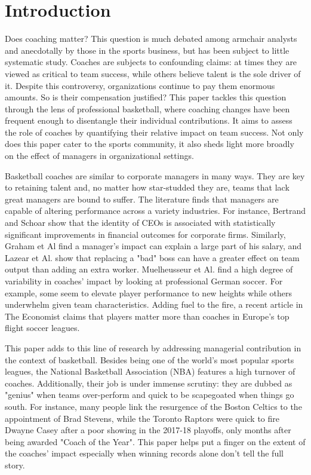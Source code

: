 \documentclass[main.tex]{subfiles}
\begin{document}
\section{Introduction}

Does coaching matter? This question is much debated among armchair analysts and anecdotally by those in the sports business, but has been subject to little systematic study. Coaches are subjects to confounding claims: at times they are viewed as critical to team success, while others believe talent is  the sole driver of it. Despite this controversy, organizations continue to pay them enormous amounts. So is their compensation justified? This paper tackles this question through the lens of professional basketball, where coaching changes have been frequent enough to disentangle their individual contributions. It aims to assess the role of coaches by quantifying their relative impact on team success. Not only does this paper cater to the sports community, it also sheds light more broadly on the effect of managers in organizational settings. 

Basketball coaches are similar to corporate managers in many ways. They are key to retaining talent and, no matter how star-studded they are, teams that lack great managers are bound to suffer. The literature finds that managers are capable of altering performance across a variety industries. For instance, Bertrand and Schoar \cite{schoar} show that the identity of CEOs is associated with statistically significant improvements in financial outcomes for corporate firms. Similarly, Graham et Al \cite{graham} find a manager's impact can explain a large part of his salary, and Lazear et Al. \cite{lazear} show that replacing a "bad" boss can have a greater effect on team output than adding an extra worker. Muelheusseur et Al. \cite{muehlheusser} find a high degree of variability in coaches' impact by looking at professional German soccer. For example, some seem to elevate player performance to new heights while others underwhelm given team characteristics. Adding fuel to the fire, a recent article in The Economist \cite{economist} claims that players matter more than coaches in Europe's top flight soccer leagues.

This paper adds to this line of research by addressing managerial contribution in the context of basketball. Besides being one of the world's most popular sports leagues, the National Basketball Association (NBA) features a high turnover of coaches. Additionally, their job is under immense scrutiny: they are dubbed as "genius" when teams over-perform and quick to be scapegoated when things go south. For instance, many people link the resurgence of the Boston Celtics to the appointment of Brad Stevens, while the Toronto Raptors were quick to fire Dwayne Casey after a poor showing in the 2017-18 playoffs, only months after being awarded "Coach of the Year". This paper helps put a finger on the extent of the coaches' impact especially when winning records alone don't tell the full story.
\end{document}
